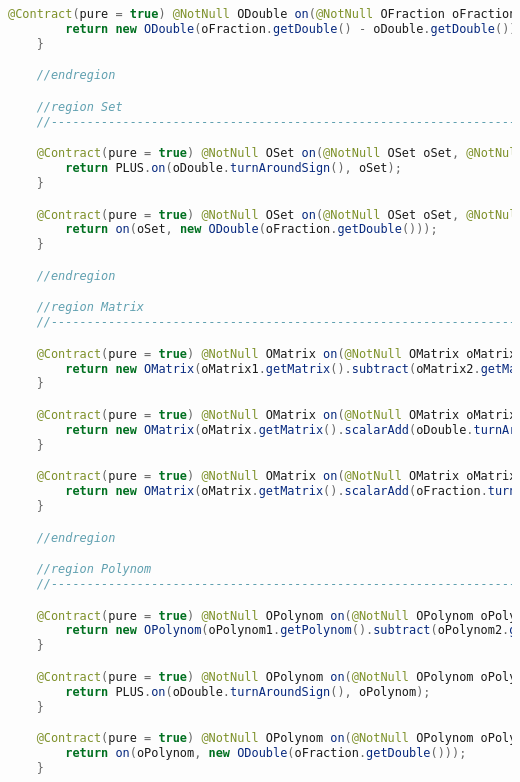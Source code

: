 \begin{lstlisting}[caption=Minus (Falk),label=list:Minus,language=Java]
    @Contract(pure = true) @NotNull ODouble on(@NotNull OFraction oFraction, @NotNull ODouble oDouble) {
        return new ODouble(oFraction.getDouble() - oDouble.getDouble());
    }

    //endregion

    //region Set
    //------------------------------------------------------------------------------------

    @Contract(pure = true) @NotNull OSet on(@NotNull OSet oSet, @NotNull ODouble oDouble) {
        return PLUS.on(oDouble.turnAroundSign(), oSet);
    }

    @Contract(pure = true) @NotNull OSet on(@NotNull OSet oSet, @NotNull OFraction oFraction) {
        return on(oSet, new ODouble(oFraction.getDouble()));
    }

    //endregion

    //region Matrix
    //------------------------------------------------------------------------------------

    @Contract(pure = true) @NotNull OMatrix on(@NotNull OMatrix oMatrix1, @NotNull OMatrix oMatrix2) {
        return new OMatrix(oMatrix1.getMatrix().subtract(oMatrix2.getMatrix()));
    }

    @Contract(pure = true) @NotNull OMatrix on(@NotNull OMatrix oMatrix, @NotNull ODouble oDouble) {
        return new OMatrix(oMatrix.getMatrix().scalarAdd(oDouble.turnAroundSign().getDouble()));
    }

    @Contract(pure = true) @NotNull OMatrix on(@NotNull OMatrix oMatrix, @NotNull OFraction oFraction) {
        return new OMatrix(oMatrix.getMatrix().scalarAdd(oFraction.turnAroundSign().getDouble()));
    }

    //endregion

    //region Polynom
    //------------------------------------------------------------------------------------

    @Contract(pure = true) @NotNull OPolynom on(@NotNull OPolynom oPolynom1, @NotNull OPolynom oPolynom2) {
        return new OPolynom(oPolynom1.getPolynom().subtract(oPolynom2.getPolynom()));
    }

    @Contract(pure = true) @NotNull OPolynom on(@NotNull OPolynom oPolynom, @NotNull ODouble oDouble) {
        return PLUS.on(oDouble.turnAroundSign(), oPolynom);
    }

    @Contract(pure = true) @NotNull OPolynom on(@NotNull OPolynom oPolynom, @NotNull OFraction oFraction) {
        return on(oPolynom, new ODouble(oFraction.getDouble()));
    }


\end{lstlisting}
